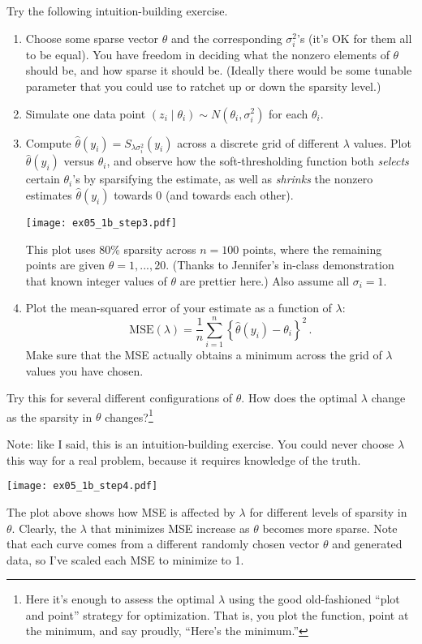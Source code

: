 \documentclass{article}
\begin{document}
\begin{enumerate}[(A)]
Try the following intuition-building exercise.
\begin{enumerate}[1.]
\item Choose some sparse vector $\theta$ and the corresponding $\sigma_i^2$'s (it's OK for them all to be equal).  You have freedom in deciding what the nonzero elements of $\theta$ should be, and how sparse it should be.  (Ideally there would be some tunable parameter that you could use to ratchet up or down the sparsity level.)
\item Simulate one data point $(z_i \mid \theta_i) \sim N(\theta_i, \sigma^2_i)$ for each $\theta_i$.
\item Compute $\widehat{\theta}(y_i) = S_{\lambda \sigma_i^2}(y_i)$ across a discrete grid of different $\lambda$ values.  Plot $\widehat{\theta}(y_i)$ versus $\theta_i$, and observe how the soft-thresholding function both \emph{selects} certain $\theta_i$'s by sparsifying the estimate, as well as \emph{shrinks} the nonzero estimates $\widehat{\theta}(y_i)$ towards 0 (and towards each other).

\color{blue}
\begin{center}
\texttt{[image: ex05\_1b\_step3.pdf]}
\end{center}
This plot uses 80\% sparsity across $n=100$ points, where the remaining points are given $\theta = 1,...,20$. (Thanks to Jennifer's in-class demonstration that known integer values of $\theta$ are prettier here.) Also assume all $\sigma_i= 1$. 
\color{black}


\item Plot the mean-squared error of your estimate as a function of $\lambda$:
$$
\mbox{MSE}(\lambda) = \frac{1}{n} \sum_{i=1}^n  \left\{ \widehat{\theta}(y_i) - \theta_i \right\}^2 \, .
$$
Make sure that the MSE actually obtains a minimum across the grid of $\lambda$ values you have chosen.
\end{enumerate}
Try this for several different configurations of $\theta$.  How does the optimal $\lambda$ change as the sparsity in $\theta$ changes?\footnote{Here it's enough to assess the optimal $\lambda$ using the good old-fashioned ``plot and point'' strategy for optimization.  That is, you plot the function, point at the minimum, and say proudly, ``Here's the minimum.''}

Note: like I said, this is an intuition-building exercise.  You could never choose $\lambda$ this way for a real problem, because it requires knowledge of the truth.
\color{blue}
\begin{center}
\texttt{[image: ex05\_1b\_step4.pdf]}
\end{center}
The plot above shows how MSE is affected by $\lambda$ for different levels of sparsity in $\theta$. Clearly, the $\lambda$ that minimizes MSE increase as $\theta$ becomes more sparse. Note that each curve comes from a different randomly chosen vector $\theta$ and generated data, so I've scaled each MSE to minimize to 1. 
\color{black}


\end{enumerate}
\end{document}
